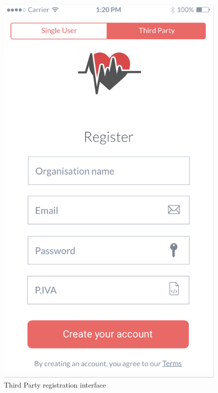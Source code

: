 \documentclass[titlepage]{article}
\begin{document}
\begin{itemize}
\begin{itemize}
					\begin{figure}[H]
						\center
  						\includegraphics[width=0.5\columnwidth]{Mockup/mockupRegisterTP.png}
  						\caption{Third Party registration interface}
 					 	\label{fig:TPRegister}
					\end{figure}


\end{itemize}
\end{itemize}
\end{document}
